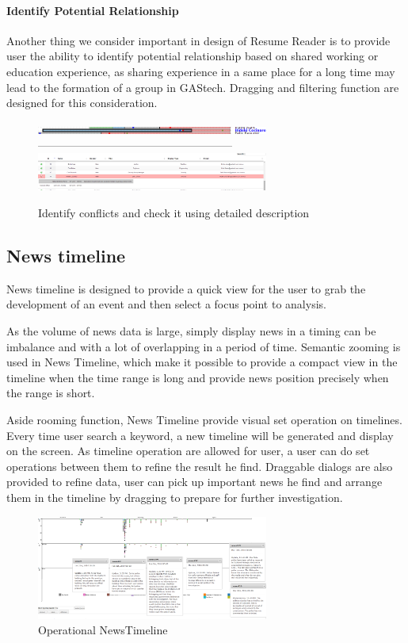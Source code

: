 \documentclass{vgtc}                          %
\begin{document}
\paragraph{Identify Potential Relationship}
Another thing we consider important in design of Resume Reader is to provide user the ability to identify potential relationship based on shared working or education experience, as sharing experience in a same place for a long time may lead to the formation of a group in GAStech. Dragging and filtering function are designed for this consideration.

\begin{figure}[htb!]
  \centering
  \includegraphics[width=3in]{SingleExperienceLine1.png}
  -----------------------------------------------------
  \includegraphics[width=3in]{SingleExperienceLine2.png}
  \caption{Identify conflicts and check it using detailed description}
\end{figure}

\subsection{News timeline}
News timeline is designed to provide a quick view for the user to grab the development of an event and then select a focus point to analysis. 
\par
As the volume of news data is large, simply display news in a timing can be imbalance and with a lot of overlapping in a period of time. Semantic zooming is used in News Timeline, which make it possible to provide a compact view in the timeline when the time range is long and provide news position precisely when the range is short.
\par
Aside rooming function, News Timeline provide visual set operation on timelines. Every time user search a keyword, a new timeline will be generated and display on the screen. As timeline operation are allowed for user, a user can do set operations between them to refine the result he find. Draggable dialogs are also provided to refine data, user can pick up important news he find and arrange them in the timeline by dragging to prepare for further investigation.
\begin{figure}[htb!]
  \centering
  \includegraphics[width=3in]{image017.png}
  \caption{Operational NewsTimeline}
\end{figure}
\end{document}
